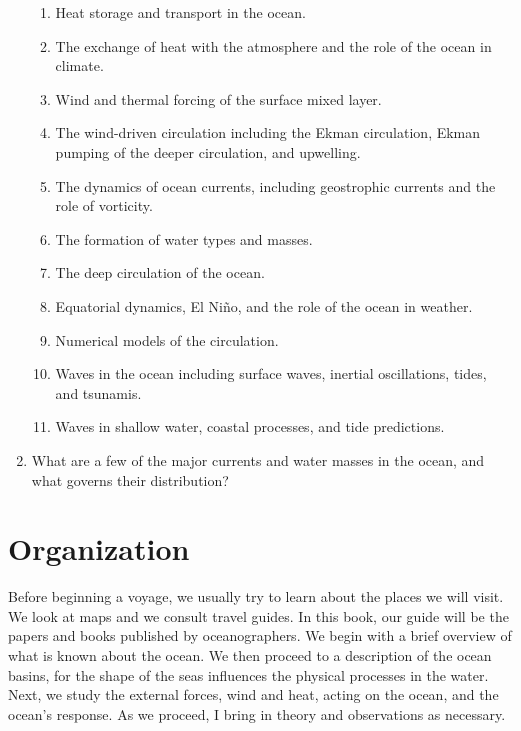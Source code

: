 \begin{enumerate}
\begin{enumerate}
\item Heat storage and transport in the ocean.
\vspace{-0.5ex}
\item The exchange of heat with the atmosphere and the role of the
  ocean in climate.
\vspace{-0.5ex}
\item Wind and thermal forcing of the surface mixed layer.
\vspace{-0.5ex}
\item The wind-driven circulation including the Ekman circulation,
  Ekman pumping of the deeper circulation, and
  upwelling.
\vspace{-0.5ex}
\item The dynamics of ocean currents, including
  geostrophic currents and the role of
  vorticity.
\vspace{-0.5ex}
\item The formation of water types and masses.
\vspace{-0.5ex}
\item The deep circulation of the ocean.
\vspace{-0.5ex}
\item Equatorial dynamics, El Ni\~{n}o, and the role of the ocean in
  weather.
\vspace{-0.5ex}
\item Numerical models of the circulation.
\vspace{-0.5ex}
\item Waves in the ocean including surface waves, inertial
  oscillations, tides, and
  tsunamis.
\vspace{-0.5ex}
\item Waves in shallow water, coastal processes, and tide predictions.
\end{enumerate}
\vspace{-0.5ex}
\item What are a few of the major currents and water masses in the
  ocean, and what governs their distribution?
\end{enumerate}

\section{Organization}
Before beginning a voyage, we usually try to learn about the places we
will visit. We look at maps and we consult travel guides. In this
book, our guide will be the papers and books published by
oceanographers. We begin with a brief overview of what is known about
the ocean. We then proceed to a description of the ocean basins, for
the shape of the seas influences the physical processes in the
water. Next, we study the external forces, wind and heat, acting on
the ocean, and the ocean's response. As we proceed, I bring in theory
and observations as necessary.

